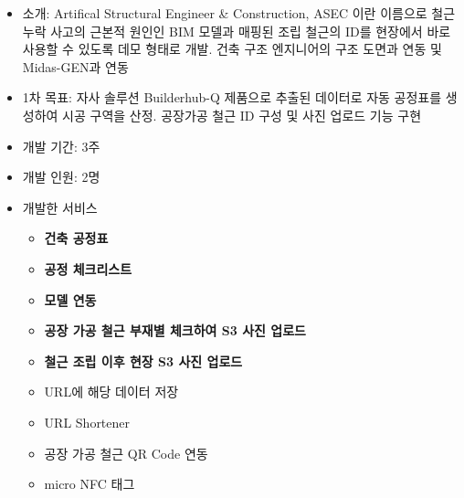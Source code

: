 \begin{itemize}[label=]
	\item 소개: Artifical Structural Engineer \& Construction, ASEC 이란 이름으로 철근 누락 사고의 근본적 원인인 BIM 모델과 매핑된 조립 철근의 ID를 현장에서 바로 사용할 수 있도록 데모 형태로 개발. 건축 구조 엔지니어의 구조 도면과 연동 및 Midas-GEN과 연동
	\item 1차 목표: 자사 솔루션 Builderhub-Q 제품으로 추출된 데이터로 자동 공정표를 생성하여 시공 구역을 산정. 공장가공 철근 ID 구성 및 사진 업로드 기능 구현 
	\item 개발 기간: 3주
	\item 개발 인원: 2명
	\item 개발한 서비스
	      \begin{itemize}[label=]
		      \item \textbf{건축 공정표}
					\item \textbf{공정 체크리스트}
					\item \textbf{모델 연동}
					\item \textbf{공장 가공 철근 부재별 체크하여 S3 사진 업로드}
					\item \textbf{철근 조립 이후 현장 S3 사진 업로드}
		      \item URL에 해당 데이터 저장
					\item URL Shortener
					\item 공장 가공 철근 QR Code 연동
					\item micro NFC 태그
	      \end{itemize}
\end{itemize}
